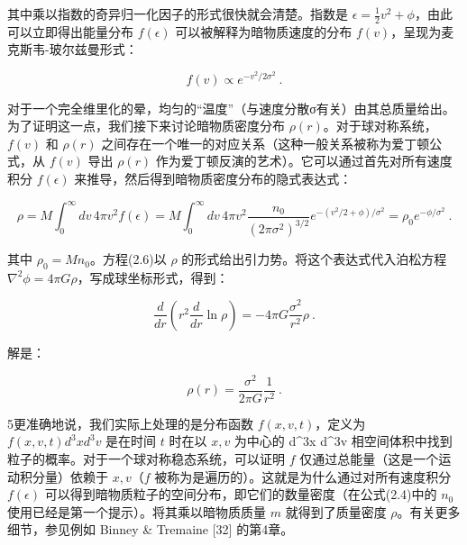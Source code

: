 其中乘以指数的奇异归一化因子的形式很快就会清楚。指数是 \(\epsilon = \frac{1}{2}v^2 + \phi\)，由此可以立即得出能量分布 \(f(\epsilon)\) 可以被解释为暗物质速度的分布 \(f(v)\)，呈现为麦克斯韦-玻尔兹曼形式：

\[ f(v) \propto e^{-v^2/2\sigma^2}~. \]

对于一个完全维里化的晕，均匀的“温度”（与速度分散σ有关）由其总质量给出。为了证明这一点，我们接下来讨论暗物质密度分布 \(\rho(r)\)。对于球对称系统，\(f(v)\) 和 \(\rho(r)\) 之间存在一个唯一的对应关系（这种一般关系被称为爱丁顿公式，从 \(f(v)\) 导出 \(\rho(r)\) 作为爱丁顿反演的艺术）。它可以通过首先对所有速度积分 \(f(\epsilon)\) 来推导，然后得到暗物质密度分布的隐式表达式：

\[ \rho = M \int_0^\infty dv \, 4\pi v^2 f(\epsilon) = M \int_0^\infty dv \, 4\pi v^2 \frac{n_0}{(2\pi\sigma^2)^{3/2}} e^{-(v^2/2+\phi)/\sigma^2} = \rho_0 e^{-\phi/\sigma^2}~. \]

其中 \(\rho_0 = Mn_0\)。方程(2.6)以 \(\rho\) 的形式给出引力势。将这个表达式代入泊松方程 \(\nabla^2\phi = 4\pi G\rho\)，写成球坐标形式，得到：

\[ \frac{d}{dr} \left( r^2 \frac{d}{dr} \ln\rho \right) = -4\pi G \frac{\sigma^2}{r^2} \rho~. \]

解是：

\[ \rho(r) = \frac{\sigma^2}{2\pi G} \frac{1}{r^2}~. \]

5更准确地说，我们实际上处理的是分布函数 \(f(x, v, t)\)，定义为 \(f(x, v, t) d^3x d^3v\) 是在时间 \(t\) 时在以 \(x, v\) 为中心的 d^3x d^3v 相空间体积中找到粒子的概率。对于一个球对称稳态系统，可以证明 \(f\) 仅通过总能量（这是一个运动积分量）依赖于 \(x, v\)（\(f\) 被称为是遍历的）。这就是为什么通过对所有速度积分 \(f(\epsilon)\) 可以得到暗物质粒子的空间分布，即它们的数量密度（在公式(2.4)中的 \(n_0\) 使用已经是第一个提示）。将其乘以暗物质质量 \(m\) 就得到了质量密度 \(\rho\)。有关更多细节，参见例如 Binney & Tremaine [32] 的第4章。
 



